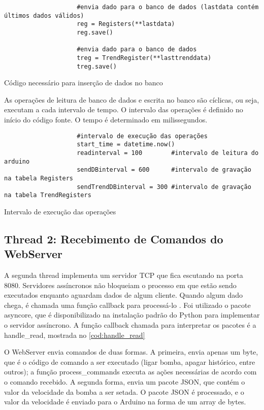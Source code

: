				\begin{listing}
					\begin{verbatim}
					#envia dado para o banco de dados (lastdata contém últimos dados válidos)
					reg = Registers(**lastdata)
					reg.save()
					
					#envia dado para o banco de dados
					treg = TrendRegister(**lasttrenddata)
					treg.save()
					\end{verbatim}
					\caption{Código necessário para inserção de dados no banco}
					\label{cod:insert_data}
				\end{listing}
			
				As operações de leitura de banco de dados e escrita no banco são cíclicas, ou seja, executam a cada intervalo de tempo. O intervalo das operações é definido no início do código fonte. O tempo é determinado em milissegundos.
				
				\begin{listing}
					\begin{verbatim}
					#intervalo de execução das operações
					start_time = datetime.now()
					readinterval = 100        #intervalo de leitura do arduino
					sendDBinterval = 600      #intervalo de gravação na tabela Registers
					sendTrendDBinterval = 300 #intervalo de gravação na tabela TrendRegisters
					\end{verbatim}
					\caption{Intervalo de execução das operações}
					\label{cod:set_interval}
				\end{listing}
			
			\subsection{Thread 2: Recebimento de Comandos do WebServer}
				A segunda thread implementa um servidor TCP que fica escutando na porta 8080. Servidores assíncronos não bloqueiam o processo em que estão sendo executados enquanto aguardam dados de algum cliente. Quando algum dado chega, é chamada uma função callback para processá-lo \cite{pythondoc}. Foi utilizado o pacote asyncore, que é disponibilizado na instalação padrão do Python para implementar o servidor assíncrono. A função callback chamada para interpretar os pacotes é a handle\_read, mostrada no \autoref{cod:handle_read}
				
				O WebServer envia comandos de duas formas. A primeira, envia apenas um byte, que é o código de comando a ser executado (ligar bomba, apagar histórico, entre outros); a função process\_commands executa as ações necessárias de acordo com o comando recebido. A segunda forma, envia um pacote JSON, que contém o valor da velocidade da bomba a ser setada. O pacote JSON é processado, e o valor da velocidade é enviado para o Arduino na forma de um array de bytes.
				
